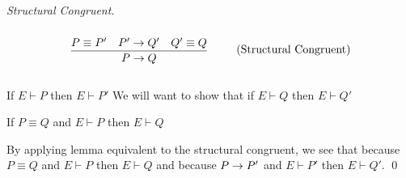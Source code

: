\begin{theorem}
    \begin{proof}[Structural Congruent]
        \begin{align*}
            \infrule{P \equiv P' \quad P' \ra Q' \quad Q' \equiv Q}{P \ra Q} \tag{Structural Congruent}
        \end{align*}


        If \ensuremath{E \vdash P} then \ensuremath{E \vdash P'} We will want to show that if \ensuremath{E \vdash Q} then \ensuremath{E \vdash Q'}

        \begin{lemma}[Equivalent]
            If \ensuremath{P \equiv Q} and \ensuremath{E \vdash P} then \ensuremath{E \vdash Q}
        \end{lemma}

        By applying lemma equivalent to the structural congruent, we see that because \ensuremath{P \equiv Q} and \ensuremath{E \vdash P} then \ensuremath{E \vdash Q} and because \ensuremath{P \ra P'} and \ensuremath{E \vdash P'} then \ensuremath{E \vdash Q'}.
        \qed
    \end{proof}
\end{theorem}
\newpage

